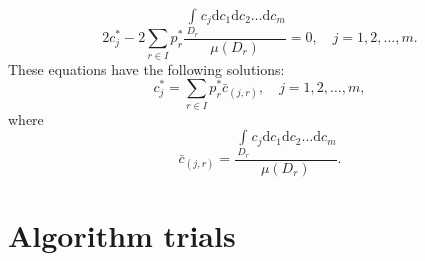 \begin{equation}
2 c_{j}^{*} - 2 \sum\limits_{r \in I} p_{r}^{*}\frac{\int\limits_{D_{r}} c_{j}\mathrm{d}c_{1}\mathrm{d}c_{2}\dots\mathrm{d}c_{m}}{\mu(D_{r})} = 0, \quad j = 1,2,\dots,m.
\end{equation}
These equations have the following solutions:
\begin{equation}
c_{j}^{*} = \sum\limits_{r \in I} p_{r}^{*} \bar{c}_{(j,r)}, \quad j = 1,2,\dots,m, \label{eq-solutions-to-cj*}
\end{equation}
where
\begin{equation}
\bar{c}_{(j,r)} = \frac{\int\limits_{D_{r}} c_{j}\mathrm{d}c_{1}\mathrm{d}c_{2}\dots\mathrm{d}c_{m}}{\mu(D_{r})}. \label{eq-cbar}
\end{equation}

\section{Algorithm trials}
